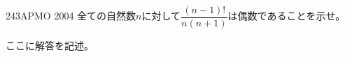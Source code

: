 \begin{prob}{243}{}{APMO 2004}
 全ての自然数$n$に対して$\dfrac{(n-1)!}{n(n+1)}$は偶数であることを示せ。\\
\end{prob}
ここに解答を記述。